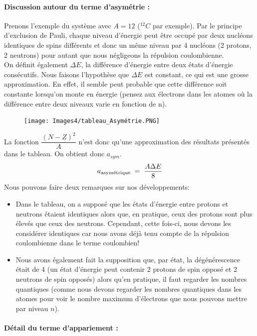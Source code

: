 \paragraph{Discussion autour du terme d'asymétrie :} 


Prenons l'exemple du système avec $A = 12$ ($^{12}C$ par exemple). Par le principe d'exclusion de Pauli, chaque niveau d'énergie peut être occupé par deux nucléons identiques de spins différents et donc un même niveau par 4 nucléons (2 protons, 2 neutrons) pour autant que nous négligeons la répulsion coulombienne.\\
On définit également $\Delta E$, la différence d'énergie entre deux états d'énergie consécutifs. Nous faisons l'hypothèse que $\Delta E$ est constant, ce qui est une grosse approximation. En effet, il semble peut probable que cette différence soit constante lorsqu'on monte en énergie (pensez aux électrons dans les atomes où la différence entre deux niveaux varie en fonction de n).\\
\begin{figure}[ht]
    \centering
    \texttt{[image: Images4/tableau\_Asymétrie.PNG]}
\end{figure}
La fonction $\dfrac{(N-Z)^2}{A}$ n'est donc qu'une approximation des résultats présentés dans le tableau. On obtient donc $a_{sym}$.
\begin{equation*}
    a_{\text{asymétrique}} \; = \; \dfrac{A\Delta E}{8}
\end{equation*}
Nous pouvons faire deux remarques sur nos développements:
\begin{itemize}[label=$\bullet$]
    \item Dans le tableau, on a supposé que les états d'énergie entre protons et neutrons étaient identiques alors que, en pratique, ceux des protons sont plus élevés que ceux des neutrons. Cependant, cette fois-ci, nous devons les considérer identiques car nous avons déjà tenu compte de la répulsion coulombienne dans le terme coulombien!
    \item Nous avons également fait la supposition que, par état, la dégénérescence était de 4 (un état d'énergie peut contenir 2 protons de spin opposé et 2 neutrons de spin opposés) alors qu'en pratique, il faut regarder les nombres quantiques (comme nous devons regarder les nombres quantiques dans les atomes pour voir le nombre maximum d'électrons que nous pouvons mettre par niveau $n$).
\end{itemize}

\paragraph{Détail du terme d'appariement :} 


